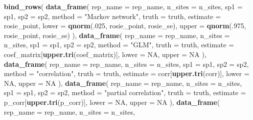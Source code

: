 \documentclass[11pt,]{article}
\newenvironment{Shaded}{\begin{snugshade}}{\end{snugshade}}
\newcommand{\KeywordTok}[1]{\textcolor[rgb]{0.13,0.29,0.53}{\textbf{{#1}}}}
\newcommand{\DataTypeTok}[1]{\textcolor[rgb]{0.13,0.29,0.53}{{#1}}}
\newcommand{\DecValTok}[1]{\textcolor[rgb]{0.00,0.00,0.81}{{#1}}}
\newcommand{\StringTok}[1]{\textcolor[rgb]{0.31,0.60,0.02}{{#1}}}
\newcommand{\OtherTok}[1]{\textcolor[rgb]{0.56,0.35,0.01}{{#1}}}
\newcommand{\NormalTok}[1]{{#1}}
\begin{document}
\begin{Shaded}
\begin{Highlighting}[]
  
  
  
  
  \KeywordTok{bind_rows}\NormalTok{(}
    \KeywordTok{data_frame}\NormalTok{(}
      \DataTypeTok{rep_name =} \NormalTok{rep_name,}
      \DataTypeTok{n_sites =} \NormalTok{n_sites,}
      \DataTypeTok{sp1 =} \NormalTok{sp1,}
      \DataTypeTok{sp2 =} \NormalTok{sp2,}
      \DataTypeTok{method =} \StringTok{"Markov network"}\NormalTok{,}
      \DataTypeTok{truth =} \NormalTok{truth,}
      \DataTypeTok{estimate =} \NormalTok{rosie_point, }
      \DataTypeTok{lower =} \KeywordTok{qnorm}\NormalTok{(.}\DecValTok{025}\NormalTok{, rosie_point, rosie_se), }
      \DataTypeTok{upper =} \KeywordTok{qnorm}\NormalTok{(.}\DecValTok{975}\NormalTok{, rosie_point, rosie_se)}
    \NormalTok{),}
    \KeywordTok{data_frame}\NormalTok{(}
      \DataTypeTok{rep_name =} \NormalTok{rep_name,}
      \DataTypeTok{n_sites =} \NormalTok{n_sites,}
      \DataTypeTok{sp1 =} \NormalTok{sp1,}
      \DataTypeTok{sp2 =} \NormalTok{sp2,}
      \DataTypeTok{method =} \StringTok{"GLM"}\NormalTok{,}
      \DataTypeTok{truth =} \NormalTok{truth,}
      \DataTypeTok{estimate =} \NormalTok{coef_matrix[}\KeywordTok{upper.tri}\NormalTok{(coef_matrix)], }
      \DataTypeTok{lower =} \OtherTok{NA}\NormalTok{, }
      \DataTypeTok{upper =} \OtherTok{NA}
    \NormalTok{),}
    \KeywordTok{data_frame}\NormalTok{(}
      \DataTypeTok{rep_name =} \NormalTok{rep_name,}
      \DataTypeTok{n_sites =} \NormalTok{n_sites,}
      \DataTypeTok{sp1 =} \NormalTok{sp1,}
      \DataTypeTok{sp2 =} \NormalTok{sp2,}
      \DataTypeTok{method =} \StringTok{"correlation"}\NormalTok{,}
      \DataTypeTok{truth =} \NormalTok{truth,}
      \DataTypeTok{estimate =} \NormalTok{corr[}\KeywordTok{upper.tri}\NormalTok{(corr)], }
      \DataTypeTok{lower =} \OtherTok{NA}\NormalTok{, }
      \DataTypeTok{upper =} \OtherTok{NA}
    \NormalTok{),}
    \KeywordTok{data_frame}\NormalTok{(}
      \DataTypeTok{rep_name =} \NormalTok{rep_name,}
      \DataTypeTok{n_sites =} \NormalTok{n_sites,}
      \DataTypeTok{sp1 =} \NormalTok{sp1,}
      \DataTypeTok{sp2 =} \NormalTok{sp2,}
      \DataTypeTok{method =} \StringTok{"partial correlation"}\NormalTok{,}
      \DataTypeTok{truth =} \NormalTok{truth,}
      \DataTypeTok{estimate =} \NormalTok{p_corr[}\KeywordTok{upper.tri}\NormalTok{(p_corr)], }
      \DataTypeTok{lower =} \OtherTok{NA}\NormalTok{, }
      \DataTypeTok{upper =} \OtherTok{NA}
    \NormalTok{),}
    \KeywordTok{data_frame}\NormalTok{(}
      \DataTypeTok{rep_name =} \NormalTok{rep_name,}
      \DataTypeTok{n_sites =} \NormalTok{n_sites,}

\end{Highlighting}
\end{Shaded}
\end{document}

